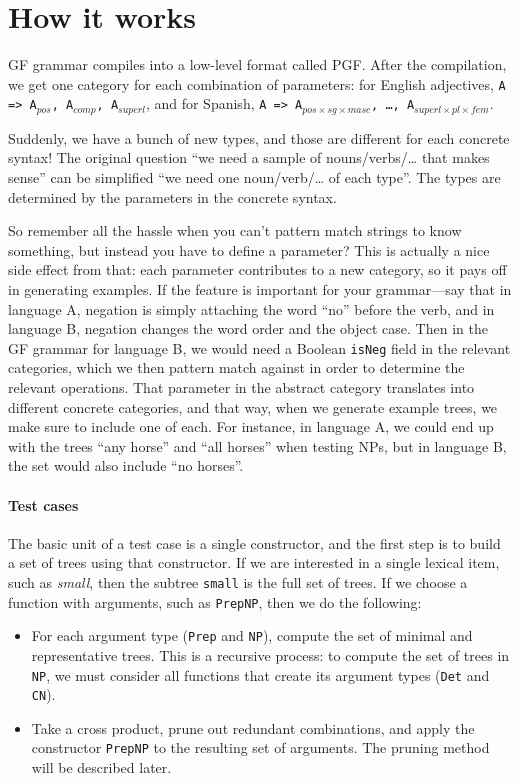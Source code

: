 \documentclass[11pt]{article}
\def\t#1{\texttt{#1}}
\begin{document}
\section{How it works}
\label{sec:details}

GF grammar compiles into a low-level format called PGF. After the
compilation, we get one category for each combination of parameters:
for English adjectives, \texttt{A => A$_{pos}$, A$_{comp}$,
A$_{superl}$}, and for Spanish, \texttt{A => A$_{pos\times{}sg\times{}masc}$, \dots,
A$_{superl\times{}pl\times{}fem}$}. 

Suddenly, we have a bunch of new types, and those are different for
each concrete syntax! The original question ``we need a sample of
nouns/verbs/… that makes sense'' can be simplified ``we need one
noun/verb/… of each type''. The types are determined by the parameters
in the concrete syntax. 

So remember all the hassle when you can't pattern match strings to
know something, but instead you have to define a parameter? This is
actually a nice side effect from that: each parameter contributes to a
new category, so it pays off in generating examples. If the feature is
important for your grammar---say that in language A, negation is
simply attaching the word  ``no'' before the verb, and in language B,
negation changes the word order and the object case. Then in the GF
grammar for language B, we would need a Boolean \texttt{isNeg} field
in the relevant categories, which we then pattern match against in
order to determine the relevant operations. That parameter in the
abstract category translates into different concrete categories, and
that way, when we generate example trees, we make sure to include one
of each. For instance, in language A, we could end up with the trees
``any horse'' and ``all horses'' when testing NPs, but in language B,
the set would also include ``no horses''. 


\paragraph{Test cases} 
The basic unit of a test case is a single constructor, and the first step 
is to build a set of trees using that constructor.
If we are interested in a single lexical item, such as \emph{small}, 
then the subtree \t{small} is the full set of trees. If we choose a function 
with arguments, such as \t{PrepNP}, then we do the following: 
\begin{itemize}
\item For each argument type (\t{Prep} and \t{NP}), compute the
  set of minimal and representative trees. This is a recursive
  process: to compute the set of trees in \t{NP}, we must consider
  all functions that create its argument types (\t{Det} and \t{CN}).
\item Take a cross product, prune out redundant combinations, and
  apply the constructor \t{PrepNP} to the resulting set of
  arguments. The pruning method will be described later. 
\end{itemize}
\end{document}
